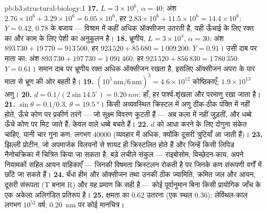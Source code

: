 \begin{solution}{pb:b3:structural-biology:1}
\textbf{17.} $L = 3\times 10^{6}$, $\alpha = 40$: अंश $2.76\times
10^{6} + 3.29\times 10^{6} = 6.05\times 10^{6}$, हर $2.83\times
10^{6} + 11.5\times 10^{6} = 14.4\times 10^{6}$: $Y = 0.42$, $0.78$ के
बजाय --- विश्राम में कहीं अधिक ऑक्सीजन उतरती है, यही ऊँचाई के लिए रक्त
का और काम के लिए पेशी का अनुकूलन है।
\textbf{18.} भ्रूणीय, $L = 3\times 10^{4}$, $\alpha = 30$: अंश
$893\,730 + 19\,770 = 913\,500$, हर $923\,520 + 85\,680 =
1\,009\,200$: $Y = 0.91$। उसी दाब पर माता का: अंश
$893\,730 + 197\,730 = 1\,091\,460$, हर $923\,520 + 856\,830
= 1\,780\,350$: $Y = 0.61$। समान दाब पर भ्रूणीय रक्त अधिक
ऑक्सीजन रखता है, इसलिए ऑक्सीजन अपरा के पार माता से भ्रूण की ओर बहती है।
\textbf{19.} $(10^{5}\,\text{nm}/6\,\text{nm})^{3} = 4.6\times 10^{12}$
कोष्ठिकाएँ; $1.9\times 10^{13}$ अणु।
\textbf{20.} $d = 0.1/(2\sin 14.5^{\circ}) = \qty{0.20}{nm}$: हाँ,
हर पार्श्व-शृंखला और परमाणु रखा जाता है।
\textbf{21.} $\sin\theta = 0.1/0.3$, $\theta = \qty{19.5}{\degree}$।
किसी अव्यवस्थित क्रिस्टल में अणु ठीक-ठीक पंक्ति में नहीं होते, ऊँचे
कोण पर प्रकीर्ण तरंगें --- जो सूक्ष्म विवरण कूटती हैं --- अब कला में
नहीं जुड़तीं, और धब्बे ऊँचे कोण पर मिट जाते हैं; केवल  वाले
धब्बे बचते हैं।
\textbf{22.} $d$ को आधा करने के लिए दोगुना संकेत चाहिए, यानी चार गुना
कण: लगभग \num{40000} (व्यवहार में अधिक, क्योंकि दूसरी त्रुटियाँ आ जाती हैं)।
\textbf{23.} झिल्ली प्रोटीन, जो अपमार्जक विलयनों से शायद ही क्रिस्टलित
होते हैं और जिन्हें किसी लिपिड नैनोचक्रिका में चित्रित किया जा सकता
है; बड़े लचीले संकुल --- राइबोसोम, विच्छेदन-काय, अपने नियामकों सहित
आयन वाहिकाएँ --- जिनकी विषमता क्रिस्टलन रोकती है पर जिनके कण संरूपणी
वर्गों में छाँटे जा सकते हैं।
\textbf{24.} बँधा हीम और ऑक्सीजन तथा उनकी ठीक ज्यामिति, क्रमित जल और
आयन, दूसरी संरूपता (T बनाम R) और यह प्रमाण कि  सही है --- कोई
पूर्वानुमान बिना किसी प्रायोगिक जाँच के एक अकेला अलिगंडित प्रतिरूप है।
\textbf{25.} क्षमता का $0.62$ उतरना (एक स्थल $0.36$); लेविंथल-काल
लगभग $10^{52}$ वर्ष; \qty{0.20}{nm} पर कोई मानचित्र।
\end{solution}
